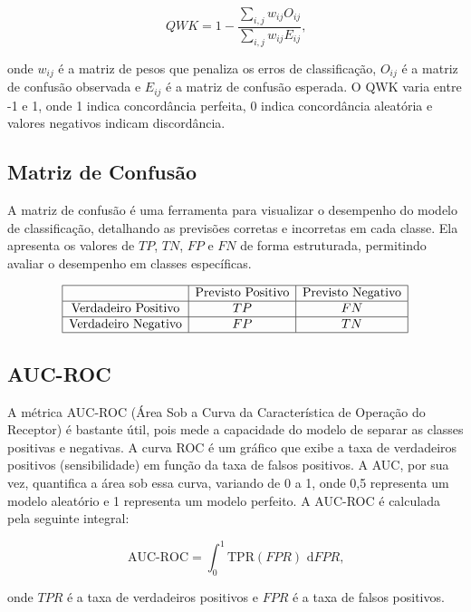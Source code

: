 \begin{equation}
    QWK = 1 - \frac{\sum_{i,j} w_{ij} O_{ij}}{\sum_{i,j} w_{ij} E_{ij}} \text{,}
\end{equation}

onde $w_{ij}$ é a matriz de pesos que penaliza os erros de classificação, $O_{ij}$ é a matriz de confusão observada e $E_{ij}$ é a matriz de confusão esperada. O QWK varia entre -1 e 1, onde 1 indica concordância perfeita, 0 indica concordância aleatória e valores negativos indicam discordância.

\subsection{Matriz de Confusão}
A matriz de confusão é uma ferramenta para visualizar o desempenho do modelo de classificação, detalhando as previsões corretas e incorretas em cada classe. Ela apresenta os valores de $TP$, $TN$, $FP$ e $FN$ de forma estruturada, permitindo avaliar o desempenho em classes específicas.

\[
\begin{array}{|c|c|c|}
\hline
 & \text{Previsto Positivo} & \text{Previsto Negativo} \\
\hline
\text{Verdadeiro Positivo} & TP & FN \\
\hline
\text{Verdadeiro Negativo} & FP & TN \\
\hline
\end{array}
\]

\subsection{AUC-ROC}
A métrica AUC-ROC (Área Sob a Curva da Característica de Operação do Receptor) é bastante útil, pois mede a capacidade do modelo de separar as classes positivas e negativas. A curva ROC é um gráfico que exibe a taxa de verdadeiros positivos (sensibilidade) em função da taxa de falsos positivos. A AUC, por sua vez, quantifica a área sob essa curva, variando de 0 a 1, onde 0,5 representa um modelo aleatório e 1 representa um modelo perfeito. A AUC-ROC é calculada pela seguinte integral:

\begin{equation}
    \text{AUC-ROC} = \int_{0}^{1} \text{TPR}(FPR) \text{ d}FPR \text{,}
\end{equation}

onde $TPR$ é a taxa de verdadeiros positivos e $FPR$ é a taxa de falsos positivos.

